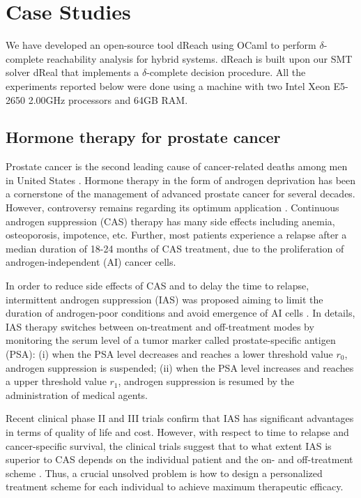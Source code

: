 \section{Case Studies}

We have developed an open-source tool dReach using OCaml to perform $\delta$-complete reachability analysis for hybrid systems. dReach is built upon our SMT solver dReal \citep{dreal} that implements a $\delta$-complete decision procedure. All the experiments reported below were done using a machine with two Intel Xeon E5-2650 2.00GHz processors and 64GB RAM.

\subsection{Hormone therapy for prostate cancer}
Prostate cancer is the second leading cause of cancer-related deaths among men in United States \citep{cancerstat}. Hormone therapy in the form of androgen deprivation has been a cornerstone of the management of advanced prostate cancer for several decades. However, controversy remains regarding its optimum application \citep{nru}. Continuous androgen suppression (CAS) therapy has many side effects including anemia, osteoporosis, impotence, etc. Further, most patients experience a relapse after a median duration of 18-24 months of CAS treatment, due to the proliferation of androgen-independent (AI) cancer cells.

In order to reduce side effects of CAS and to delay the time to relapse, intermittent androgen suppression (IAS) was proposed aiming to limit the duration of androgen-poor conditions and avoid emergence of AI cells \citep{bruchovsky95}. In details, IAS therapy switches between on-treatment and off-treatment modes by monitoring the serum level of a tumor marker called prostate-specific antigen (PSA):  (i) when the PSA level decreases and reaches a lower threshold value $r_0$, androgen suppression is suspended; (ii) when the PSA level increases and reaches a upper threshold value $r_1$, androgen suppression is resumed by the administration of medical agents.

Recent clinical phase II and III trials confirm that IAS has significant advantages in terms of quality of life and cost. However, with respect to time to relapse and cancer-specific survival, the clinical trials suggest that to what extent IAS is superior to CAS depends on the individual patient and the on- and off-treatment scheme \citep{bruchovsky06,bruchovsky07,book13}. Thus, a crucial unsolved problem is how to design a personalized treatment scheme for each individual to achieve maximum therapeutic efficacy.


